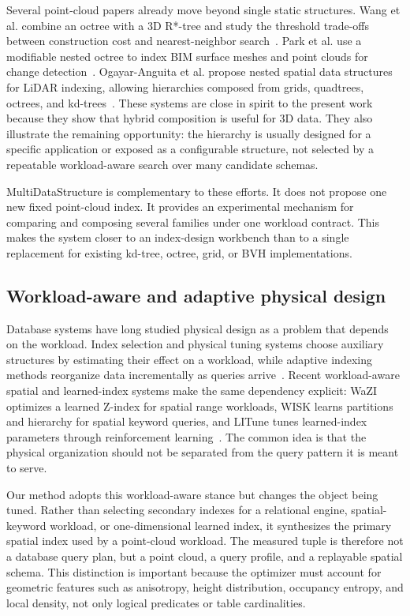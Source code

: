 Several point-cloud papers already move beyond single static structures. Wang et al. combine an octree with a 3D R*-tree and study the threshold trade-offs between construction cost and nearest-neighbor search~\cite{wang2021hybridpointcloud}. Park et al. use a modifiable nested octree to index BIM surface meshes and point clouds for change detection~\cite{park2021nestedoctree}. Ogayar-Anguita et al. propose nested spatial data structures for LiDAR indexing, allowing hierarchies composed from grids, quadtrees, octrees, and kd-trees~\cite{ogayar2023nestedlidar}. These systems are close in spirit to the present work because they show that hybrid composition is useful for 3D data. They also illustrate the remaining opportunity: the hierarchy is usually designed for a specific application or exposed as a configurable structure, not selected by a repeatable workload-aware search over many candidate schemas.

MultiDataStructure is complementary to these efforts. It does not propose one new fixed point-cloud index. It provides an experimental mechanism for comparing and composing several families under one workload contract. This makes the system closer to an index-design workbench than to a single replacement for existing kd-tree, octree, grid, or BVH implementations.

\subsection{Workload-aware and adaptive physical design}

Database systems have long studied physical design as a problem that depends on the workload. Index selection and physical tuning systems choose auxiliary structures by estimating their effect on a workload, while adaptive indexing methods reorganize data incrementally as queries arrive~\cite{chaudhuri1997indexselection,idreos2007databasecracking,halim2012stochasticcracking}. Recent workload-aware spatial and learned-index systems make the same dependency explicit: WaZI optimizes a learned Z-index for spatial range workloads, WISK learns partitions and hierarchy for spatial keyword queries, and LITune tunes learned-index parameters through reinforcement learning~\cite{pai2023wazi,sheng2023wisk,wang2025litune}. The common idea is that the physical organization should not be separated from the query pattern it is meant to serve.

Our method adopts this workload-aware stance but changes the object being tuned. Rather than selecting secondary indexes for a relational engine, spatial-keyword workload, or one-dimensional learned index, it synthesizes the primary spatial index used by a point-cloud workload. The measured tuple is therefore not a database query plan, but a point cloud, a query profile, and a replayable spatial schema. This distinction is important because the optimizer must account for geometric features such as anisotropy, height distribution, occupancy entropy, and local density, not only logical predicates or table cardinalities.

